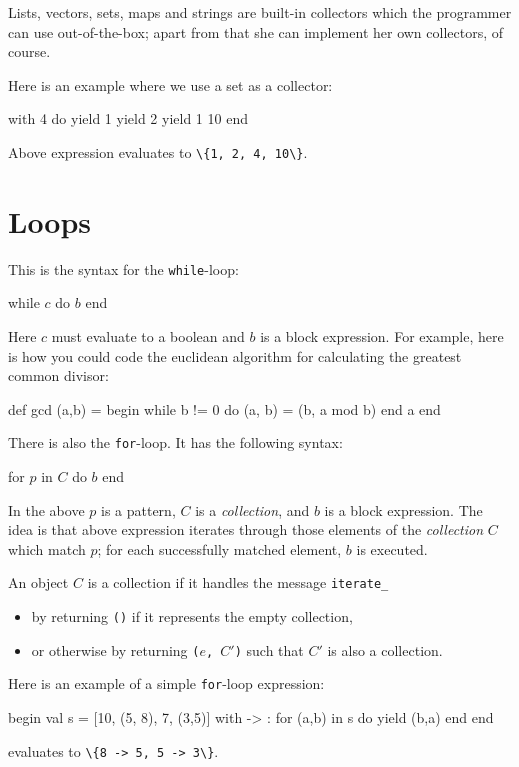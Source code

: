 \documentclass[11pt]{amsart}
\newcommand{\babelsrc}[1] {\lstinline!#1!}
\begin{document}
Lists, vectors, sets, maps and strings are built-in collectors which the programmer can use out-of-the-box; apart from that she can implement her own collectors, of course.

Here is an example where we use a set as a collector:
\begin{babellisting}
with {4} do
  yield 1
  yield 2
  yield 1
  10
end
\end{babellisting}
Above expression evaluates to \babelsrc{\{1, 2, 4, 10\}}.

\section{Loops}\label{sec:loops}
This is the syntax for the \babelsrc{while}-loop:
\begin{babellisting}
while $c$ do
  $b$
end
\end{babellisting}
Here $c$ must evaluate to a boolean and $b$ is a block expression. For example, here is how you could code the euclidean algorithm for calculating the greatest common divisor:
\begin{babellisting}
def gcd (a,b) = begin
  while b != 0 do
    (a, b) = (b, a mod b)
  end
  a
end
\end{babellisting}

There is also the \babelsrc{for}-loop. It has the following syntax:
\begin{babellisting}
for $p$ in $C$ do
  $b$
end
\end{babellisting}
In the above $p$ is a pattern, $C$ is a \emph{collection}, and $b$ is a block expression.
The idea is that above expression iterates through those elements of the \emph{collection} $C$ 
which match $p$; for each successfully matched element, $b$ is executed. 

An object $C$ is a collection if it handles the message \texttt{iterate\_}
\begin{itemize}
\item by returning \texttt{()} if it represents the empty collection,
\item or otherwise by returning \texttt{($e$, $C'$)} such that $C'$ is also a collection.
\end{itemize}

Here is an example of a simple \babelsrc{for}-loop expression:
\begin{babellisting}
begin
  val s = [10, (5, 8), 7, (3,5)]
  with {->} : for (a,b) in s do
    yield (b,a)
  end
end
\end{babellisting}
evaluates to \babelsrc{\{8 -> 5, 5 -> 3\}}.
\end{document}
